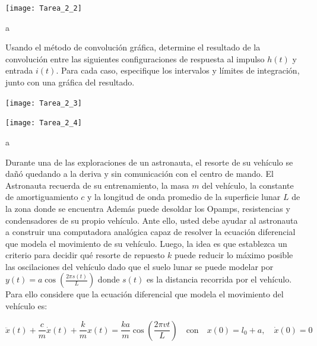 \documentclass[
  11pt,
  letterpaper,
   addpoints,
  ]{exam}
\begin{document}
\begin{questions}
    \begin{center}
        \texttt{[image: Tarea\_2\_2]}
    \end{center}
    \begin{solution}
       a
    \end{solution}
\question Usando el método de convolución gráfica, determine el resultado de la convolución entre las siguientes configuraciones de respuesta al impulso $h(t)$ y entrada $i(t)$. Para cada caso, especifique los intervalos y límites de integración, junto con una gráfica del resultado.
\begin{center}
    \texttt{[image: Tarea\_2\_3]}
\end{center}
\begin{center}
    \texttt{[image: Tarea\_2\_4]}
\end{center}
\begin{solution}
    a
\end{solution}
\question Durante una de las exploraciones de un astronauta, el resorte de su vehículo se dañó quedando a la deriva y sin comunicación con el centro de mando. El Astronauta recuerda de su entrenamiento, la masa \( m \) del vehículo, la constante de amortiguamiento \( c \) y la longitud de onda promedio de la superficie lunar \( L \) de la zona donde se encuentra Además puede desoldar los Opamps, resistencias y condensadores de su propio vehículo. Ante ello, usted debe ayudar al astronauta a construir una computadora analógica capaz de resolver la ecuación diferencial que modela el movimiento de su vehículo. Luego, la idea es que establezca un criterio para decidir qué resorte de repuesto \( k \) puede reducir lo máximo posible las oscilaciones del vehículo dado que el suelo lunar se puede modelar por \( y(t) = a \cos \left( \frac{2 \pi s(t)}{L} \right) \) donde \( s(t) \) es la distancia recorrida por el vehículo. Para ello considere que la ecuación diferencial que modela el movimiento del vehículo es:

\begin{equation}
\ddot{x}(t) + \frac{c}{m} \dot{x}(t) + \frac{k}{m} x(t) = \frac{ka}{m} \cos \left( \frac{2 \pi v t}{L} \right)
\quad \text{con} \quad x(0) = l_0 + a, \quad \dot{x}(0) = 0
\end{equation}


\end{questions}
\end{document}
